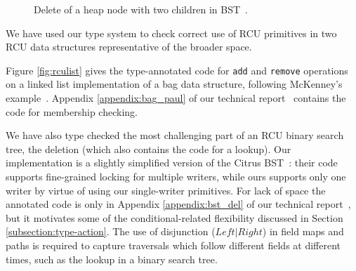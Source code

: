 \begin{figure}[!t]
\begin{subfigure}[b]{.4\linewidth}
\label{fig:del2.6}
\end{subfigure}
\caption{\textsf{Delete} of a heap node with two children in BST~\cite{Arbel:2014:CUR:2611462.2611471}.}
\label{fig:del2}
\end{figure}
We have used our type system to check correct use of RCU primitives in two RCU data structures representative of the broader space.

Figure \ref{fig:rculist} gives the type-annotated code for \lstinline|add| and \lstinline|remove| operations on a linked list implementation of a bag data structure, following McKenney's example~\cite{McKenney2015SomeEO}.
Appendix \ref{appendix:bag_paul} of our technical report~\cite{isotek} contains the code for membership checking.

We have also type checked the most challenging part of an RCU binary search tree, the deletion (which also contains the code for a lookup).
Our implementation is a slightly simplified version of the Citrus BST~\cite{Arbel:2014:CUR:2611462.2611471}: their code supports fine-grained locking for multiple writers, while ours supports only one writer by virtue of using our single-writer primitives. For lack of space the annotated code is only in Appendix \ref{appendix:bst_del} of our technical report~\cite{isotek}, but it motivates some of the conditional-related flexibility discussed in Section \ref{subsection:type-action}.
The use of disjunction ($Left|Right$) in field maps and paths is required to capture traversals which follow different fields at different times, such as the lookup in a binary search tree.


